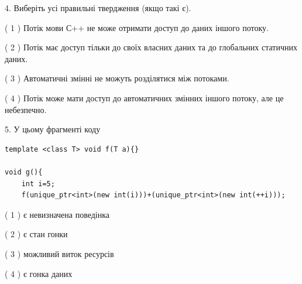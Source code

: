 \documentclass[12pt, ukrainian]{article}
\begin{document}
\begin {large}
{%
4. Виберіть усі правильні твердження (якщо такі є).\par
\vspace{2mm}

( 1 ) Потік мови С++ не може отримати доступ до даних іншого потоку.%

( 2 ) Потік має доступ тільки до своїх власних даних та до глобальних статичних даних.%

( 3 ) Автоматичні змінні не можуть розділятися між потоками.%

( 4 ) Потік може мати доступ до автоматичних змінних іншого потоку, але це небезпечно.%


5. У цьому фрагменті коду
\begin{verbatim}
template <class T> void f(T a){}

void g(){
    int i=5;
    f(unique_ptr<int>(new int(i)))+(unique_ptr<int>(new int(++i)));
\end{verbatim}
( 1 ) є невизначена поведінка%

( 2 ) є стан гонки%

( 3 ) можливий виток ресурсів%

( 4 ) є гонка даних%
}
\end {large}
\end{document}
